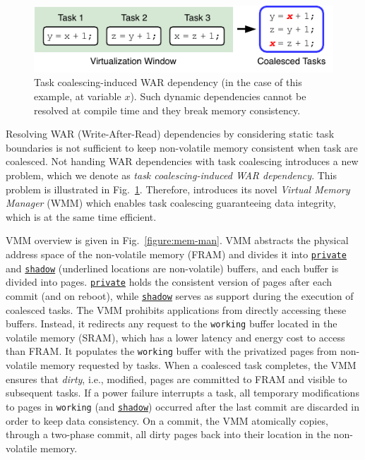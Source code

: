 \begin{figure}
	\centering
	\includegraphics[width=\columnwidth]{figures/coalesced-war.pdf}
	\caption{Task coalescing-induced WAR dependency (in the case of this example, at variable $x$). Such dynamic dependencies cannot be resolved at compile time and they break memory consistency.}
	\label{figure:coalescedWar}
\end{figure}

Resolving WAR (Write-After-Read) dependencies by considering static task boundaries is not sufficient to keep non-volatile memory consistent when task are coalesced. Not handing WAR dependencies with task coalescing introduces a new problem, which we denote as \emph{task coalescing-induced WAR dependency}. This problem is illustrated in Fig.~\ref{figure:coalescedWar}. Therefore, \sys introduces its novel {\em Virtual Memory Manager} (WMM) which enables task coalescing guaranteeing data integrity, which is at the same time efficient.

VMM overview is given in Fig.~\ref{figure:mem-man}.
VMM abstracts the physical address space of the non-volatile memory (FRAM) and divides it into \texttt{\underline{private}} and \texttt{\underline{shadow}} (underlined locations are non-volatile) buffers, and each buffer is divided into pages.
\texttt{\underline{private}} holds the consistent version of pages after each commit (and on reboot), while \texttt{\underline{shadow}} serves as support during the execution of coalesced tasks.
The VMM prohibits applications from directly accessing these buffers.
Instead, it redirects any request to the \texttt{working} buffer located in the volatile memory (SRAM), which has a lower latency and energy cost to access than FRAM.
It populates the \texttt{working} buffer with the privatized pages from non-volatile memory requested by tasks.
When a coalesced task completes, the VMM ensures that {\em dirty}, i.e., modified, pages are committed to FRAM and visible to subsequent tasks.
If a power failure interrupts a task, all temporary modifications to pages in \texttt{working} (and \texttt{\underline{shadow}}) occurred after the last commit are discarded in order to keep data consistency.
On a commit, the VMM atomically copies, through a two-phase commit, all dirty pages back into their location in the non-volatile memory.

